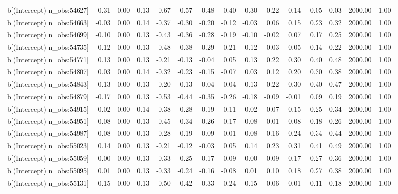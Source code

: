 \begin{table}[ht]
\begin{tabular}{rrrrrrrrrrrrrrr}
  b[(Intercept) n\_obs:54627] & -0.31 & 0.00 & 0.13 & -0.67 & -0.57 & -0.48 & -0.40 & -0.30 & -0.22 & -0.14 & -0.05 & 0.03 & 2000.00 & 1.00 \\ 
  b[(Intercept) n\_obs:54663] & -0.03 & 0.00 & 0.14 & -0.37 & -0.30 & -0.20 & -0.12 & -0.03 & 0.06 & 0.15 & 0.23 & 0.32 & 2000.00 & 1.00 \\ 
  b[(Intercept) n\_obs:54699] & -0.10 & 0.00 & 0.13 & -0.43 & -0.36 & -0.28 & -0.19 & -0.10 & -0.02 & 0.07 & 0.17 & 0.25 & 2000.00 & 1.00 \\ 
  b[(Intercept) n\_obs:54735] & -0.12 & 0.00 & 0.13 & -0.48 & -0.38 & -0.29 & -0.21 & -0.12 & -0.03 & 0.05 & 0.14 & 0.22 & 2000.00 & 1.00 \\ 
  b[(Intercept) n\_obs:54771] & 0.13 & 0.00 & 0.13 & -0.21 & -0.13 & -0.04 & 0.05 & 0.13 & 0.22 & 0.30 & 0.40 & 0.48 & 2000.00 & 1.00 \\ 
  b[(Intercept) n\_obs:54807] & 0.03 & 0.00 & 0.14 & -0.32 & -0.23 & -0.15 & -0.07 & 0.03 & 0.12 & 0.20 & 0.30 & 0.38 & 2000.00 & 1.00 \\ 
  b[(Intercept) n\_obs:54843] & 0.13 & 0.00 & 0.13 & -0.20 & -0.13 & -0.04 & 0.04 & 0.13 & 0.22 & 0.30 & 0.40 & 0.47 & 2000.00 & 1.00 \\ 
  b[(Intercept) n\_obs:54879] & -0.17 & 0.00 & 0.13 & -0.53 & -0.44 & -0.35 & -0.26 & -0.18 & -0.09 & -0.01 & 0.09 & 0.19 & 2000.00 & 1.00 \\ 
  b[(Intercept) n\_obs:54915] & -0.02 & 0.00 & 0.14 & -0.38 & -0.28 & -0.19 & -0.11 & -0.02 & 0.07 & 0.15 & 0.25 & 0.34 & 2000.00 & 1.00 \\ 
  b[(Intercept) n\_obs:54951] & -0.08 & 0.00 & 0.13 & -0.45 & -0.34 & -0.26 & -0.17 & -0.08 & 0.01 & 0.08 & 0.18 & 0.26 & 2000.00 & 1.00 \\ 
  b[(Intercept) n\_obs:54987] & 0.08 & 0.00 & 0.13 & -0.28 & -0.19 & -0.09 & -0.01 & 0.08 & 0.16 & 0.24 & 0.34 & 0.44 & 2000.00 & 1.00 \\ 
  b[(Intercept) n\_obs:55023] & 0.14 & 0.00 & 0.13 & -0.21 & -0.12 & -0.03 & 0.05 & 0.14 & 0.23 & 0.31 & 0.41 & 0.49 & 2000.00 & 1.00 \\ 
  b[(Intercept) n\_obs:55059] & 0.00 & 0.00 & 0.13 & -0.33 & -0.25 & -0.17 & -0.09 & 0.00 & 0.09 & 0.17 & 0.27 & 0.36 & 2000.00 & 1.00 \\ 
  b[(Intercept) n\_obs:55095] & 0.01 & 0.00 & 0.13 & -0.33 & -0.24 & -0.16 & -0.08 & 0.01 & 0.10 & 0.18 & 0.27 & 0.38 & 2000.00 & 1.00 \\ 
  b[(Intercept) n\_obs:55131] & -0.15 & 0.00 & 0.13 & -0.50 & -0.42 & -0.33 & -0.24 & -0.15 & -0.06 & 0.01 & 0.11 & 0.18 & 2000.00 & 1.00 \\ 

\end{tabular}
\end{table}
